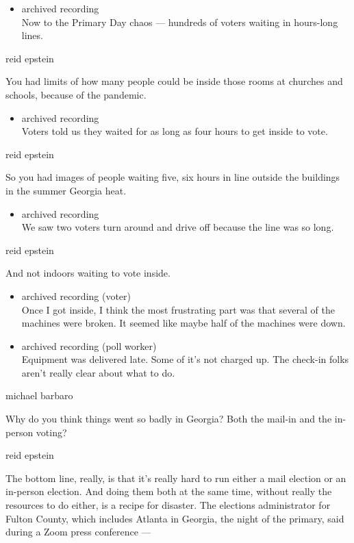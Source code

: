 \begin{itemize}
\tightlist
\item
  archived recording\\
  Now to the Primary Day chaos --- hundreds of voters waiting in
  hours-long lines.
\end{itemize}

reid epstein

You had limits of how many people could be inside those rooms at
churches and schools, because of the pandemic.

\begin{itemize}
\tightlist
\item
  archived recording\\
  Voters told us they waited for as long as four hours to get inside to
  vote.
\end{itemize}

reid epstein

So you had images of people waiting five, six hours in line outside the
buildings in the summer Georgia heat.

\begin{itemize}
\tightlist
\item
  archived recording\\
  We saw two voters turn around and drive off because the line was so
  long.
\end{itemize}

reid epstein

And not indoors waiting to vote inside.

\begin{itemize}
\item
  archived recording (voter)\\
  Once I got inside, I think the most frustrating part was that several
  of the machines were broken. It seemed like maybe half of the machines
  were down.
\item
  archived recording (poll worker)\\
  Equipment was delivered late. Some of it's not charged up. The
  check-in folks aren't really clear about what to do.
\end{itemize}

michael barbaro

Why do you think things went so badly in Georgia? Both the mail-in and
the in-person voting?

reid epstein

The bottom line, really, is that it's really hard to run either a mail
election or an in-person election. And doing them both at the same time,
without really the resources to do either, is a recipe for disaster. The
elections administrator for Fulton County, which includes Atlanta in
Georgia, the night of the primary, said during a Zoom press conference
---

